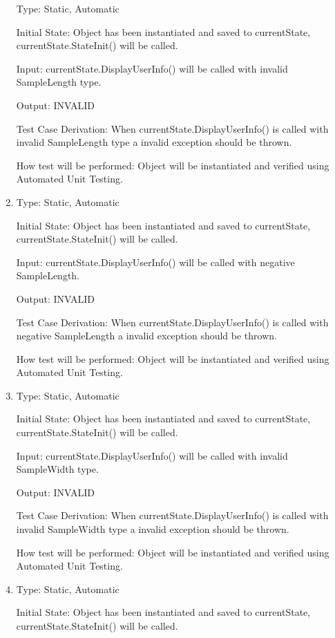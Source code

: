 \documentclass[12pt, titlepage]{article}
\begin{document}
\begin{enumerate}[{UT-CS}1.]
Type: Static, Automatic
					
Initial State: Object has been instantiated and saved to currentState, currentState.StateInit() will be called.
					
Input: currentState.DisplayUserInfo() will be called with invalid SampleLength type.
					
Output: INVALID

Test Case Derivation: When currentState.DisplayUserInfo() is called with invalid SampleLength type a invalid exception should be thrown.

How test will be performed: Object will be instantiated and verified using Automated Unit Testing.

\item

Type: Static, Automatic
					
Initial State: Object has been instantiated and saved to currentState, currentState.StateInit() will be called.
					
Input: currentState.DisplayUserInfo() will be called with negative SampleLength.
					
Output: INVALID

Test Case Derivation: When currentState.DisplayUserInfo() is called with negative SampleLength a invalid exception should be thrown.

How test will be performed: Object will be instantiated and verified using Automated Unit Testing.

\item

Type: Static, Automatic
					
Initial State: Object has been instantiated and saved to currentState, currentState.StateInit() will be called.
					
Input: currentState.DisplayUserInfo() will be called with invalid SampleWidth type.
					
Output: INVALID

Test Case Derivation: When currentState.DisplayUserInfo() is called with invalid SampleWidth type a invalid exception should be thrown.

How test will be performed: Object will be instantiated and verified using Automated Unit Testing.

\item

Type: Static, Automatic
					
Initial State: Object has been instantiated and saved to currentState, currentState.StateInit() will be called.
					

\end{enumerate}
\end{document}
